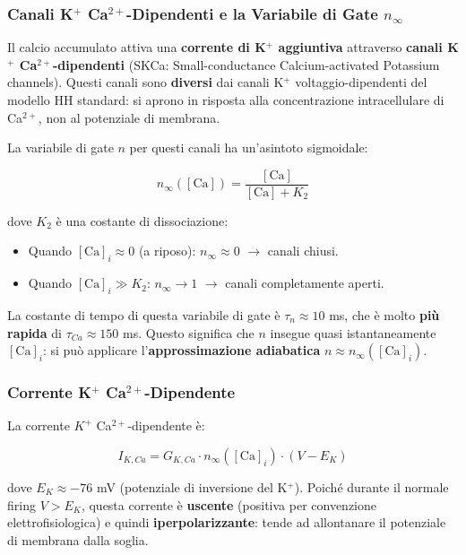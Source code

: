 \subsubsection{Canali K$^+$ Ca$^{2+}$-Dipendenti e la Variabile di Gate $n_\infty$}

Il calcio accumulato attiva una \textbf{corrente di K$^+$ aggiuntiva} attraverso \textbf{canali K$^+$ Ca$^{2+}$-dipendenti} (SKCa: Small-conductance Calcium-activated Potassium channels). Questi canali sono \textbf{diversi} dai canali K$^+$ voltaggio-dipendenti del modello HH standard: si aprono in risposta alla concentrazione intracellulare di Ca$^{2+}$, non al potenziale di membrana.

La variabile di gate $n$ per questi canali ha un'asintoto sigmoidale:

\begin{equation}
n_\infty([\text{Ca}]) = \frac{[\text{Ca}]}{[\text{Ca}] + K_2}
\end{equation}

dove $K_2$ è una costante di dissociazione:
\begin{itemize}
    \item Quando $[\text{Ca}]_i \approx 0$ (a riposo): $n_\infty \approx 0$ $\rightarrow$ canali chiusi.
    \item Quando $[\text{Ca}]_i \gg K_2$: $n_\infty \to 1$ $\rightarrow$ canali completamente aperti.
\end{itemize}

La costante di tempo di questa variabile di gate è $\tau_n \approx 10$ ms, che è molto \textbf{più rapida} di $\tau_{Ca} \approx 150$ ms. Questo significa che $n$ insegue quasi istantaneamente $[\text{Ca}]_i$: si può applicare l'\textbf{approssimazione adiabatica} $n \approx n_\infty([\text{Ca}]_i)$.

\subsubsection{Corrente K$^+$ Ca$^{2+}$-Dipendente}

La corrente $K^+$ Ca$^{2+}$-dipendente è:

\begin{equation}
I_{K,Ca} = G_{K,Ca} \cdot n_\infty([\text{Ca}]_i) \cdot (V - E_K)
\end{equation}

dove $E_K \approx -76$ mV (potenziale di inversione del K$^+$). Poiché durante il normale firing $V > E_K$, questa corrente è \textbf{uscente} (positiva per convenzione elettrofisiologica) e quindi \textbf{iperpolarizzante}: tende ad allontanare il potenziale di membrana dalla soglia.


